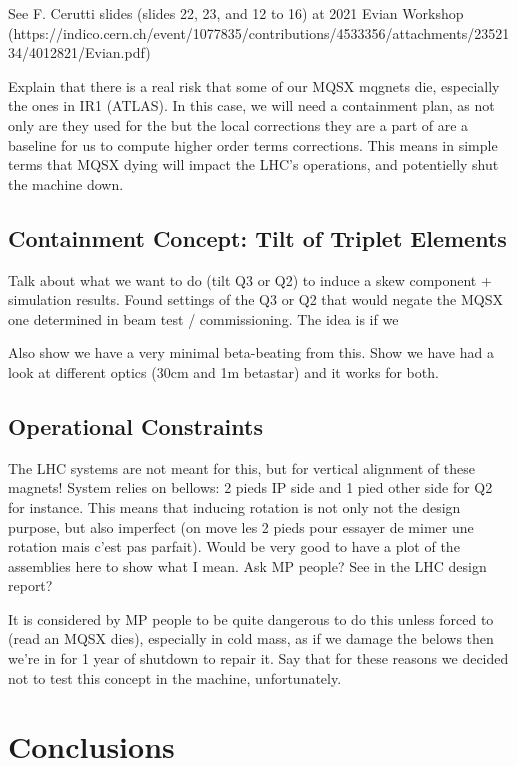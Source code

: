 See F. Cerutti slides (slides 22, 23, and 12 to 16) at 2021 Evian Workshop
(https://indico.cern.ch/event/1077835/contributions/4533356/attachments/2352134/4012821/Evian.pdf)

Explain that there is a real risk that some of our MQSX mqgnets die, especially the ones in IR1 (ATLAS).
In this case, we will need a containment plan, as not only are they used for the but the local corrections they are a part of are a baseline for us to compute higher order terms corrections.
This means in simple terms that MQSX dying will impact the LHC's operations, and potentielly shut the machine down.

\subsection{Containment Concept: Tilt of Triplet Elements}

Talk about what we want to do (tilt Q3 or Q2) to induce a skew component + simulation results.
Found settings of the Q3 or Q2 that would negate the MQSX one determined in beam test / commissioning.
The idea is if we 

Also show we have a very minimal beta-beating from this.
Show we have had a look at different optics (30cm and 1m betastar) and it works for both.

\subsection{Operational Constraints}

The LHC systems are not meant for this, but for vertical alignment of these magnets!
System relies on bellows: 2 pieds IP side and 1 pied other side for Q2 for instance.
This means that inducing rotation is not only not the design purpose, but also imperfect (on move les 2 pieds pour essayer de mimer une rotation mais c'est pas parfait).
Would be very good to have a plot of the assemblies here to show what I mean. Ask MP people? See in the LHC design report?

It is considered by MP people to be quite dangerous to do this unless forced to (read an MQSX dies), especially in cold mass, as if we damage the belows then we're in for 1 year of shutdown to repair it.
Say that for these reasons we decided not to test this concept in the machine, unfortunately.


\section{Conclusions}

